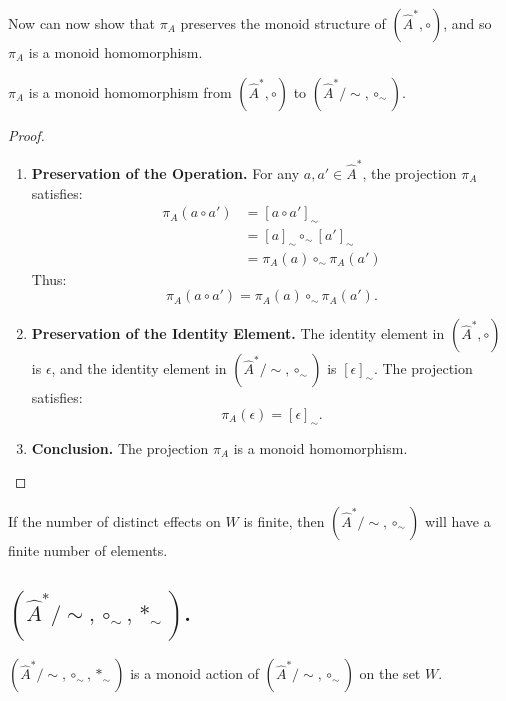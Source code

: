 Now can now show that $\pi_{A}$ preserves the monoid structure of $(\hat{A}^{\ast}, \circ)$, and so $\pi_{A}$ is a monoid homomorphism.
\begin{proposition}
	$\pi_{A}$ is a monoid homomorphism from $(\hat{A}^{\ast}, \circ)$ to $(\hat{A}^{\ast}/\sim, \circ_{\sim})$.
\end{proposition}
\begin{proof}
	\begin{enumerate}[(1)]
		\item \textbf{Preservation of the Operation.}
		      For any $a, a' \in \hat{A}^{\ast}$, the projection $\pi_{A}$ satisfies:
		      \begin{align}
			      \pi_{A}(a \circ a') & = [a \circ a']_{\sim}                 \\
			                          & = [a]_{\sim} \circ_{\sim} [a']_{\sim} \\
			                          & = \pi_{A}(a) \circ_{\sim} \pi_{A}(a')
		      \end{align}
		      Thus:
		      \begin{equation}
			      \pi_{A}(a \circ a') = \pi_{A}(a) \circ_{\sim} \pi_{A}(a').
		      \end{equation}

		\item \textbf{Preservation of the Identity Element.}
		      The identity element in $(\hat{A}^{\ast}, \circ)$ is $\epsilon$, and the identity element in $(\hat{A}^{\ast}/\sim, \circ_{\sim})$ is $[\epsilon]_{\sim}$.
		      The projection satisfies:
		      \begin{equation}
			      \pi_{A}(\epsilon) = [\epsilon]_{\sim}.
		      \end{equation}

		\item \textbf{Conclusion.}
		      The projection $\pi_{A}$ is a monoid homomorphism.
	\end{enumerate}
\end{proof}

If the number of distinct effects on $W$ is finite, then $(\hat{A}^{\ast}/\sim, \circ_{\sim})$ will have a finite number of elements.

\subsection{$(\hat{A}^{\ast}/\sim, \circ_{\sim}, \ast_{\sim})$.}

\begin{proposition}
	$(\hat{A}^{\ast}/\sim, \circ_{\sim}, \ast_{\sim})$ is a monoid action of $(\hat{A}^{\ast}/\sim, \circ_{\sim})$ on the set $W$.
\end{proposition}

